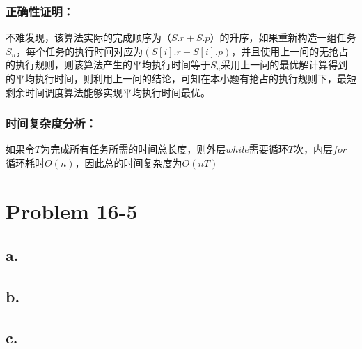 ﻿\documentclass{article}
\begin{document}
        \subsubsection*{正确性证明：}
            不难发现，该算法实际的完成顺序为$（S.r+S.p）$的升序，如果重新构造一组任务$S_n$，每个任务的执行时间对应为$(S[i].r+S[i].p)$，并且使用上一问的无抢占的执行规则，则该算法产生的平均执行时间等于$S_n$采用上一问的最优解计算得到的平均执行时间，则利用上一问的结论，可知在本小题有抢占的执行规则下，最短剩余时间调度算法能够实现平均执行时间最优。
        \subsubsection*{时间复杂度分析：}
            如果令$T$为完成所有任务所需的时间总长度，则外层$while$需要循环$T$次，内层$for$循环耗时$O(n)$，因此总的时间复杂度为$O(nT)$
  \section*{Problem 16-5}
    \subsection*{a.}
    \subsection*{b.}
    \subsection*{c.}
\end{document}
